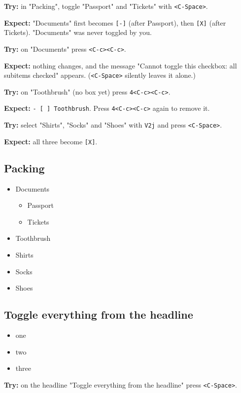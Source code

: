 \textbf{Try:} in "Packing", toggle "Passport" and "Tickets" with \texttt{<C-Space>}.

\textbf{Expect:} "Documents" first becomes \texttt{[-]} (after Passport), then \texttt{[X]}
(after Tickets). "Documents" was never toggled by you.

\textbf{Try:} on "Documents" press \texttt{<C-c><C-c>}.

\textbf{Expect:} nothing changes, and the message "Cannot toggle this checkbox:
all subitems checked" appears. (\texttt{<C-Space>} silently leaves it alone.)

\textbf{Try:} on "Toothbrush" (no box yet) press \texttt{4<C-c><C-c>}.

\textbf{Expect:} \texttt{- [ ] Toothbrush}. Press \texttt{4<C-c><C-c>} again to remove it.

\textbf{Try:} select "Shirts", "Socks" and "Shoes" with \texttt{V2j} and press
\texttt{<C-Space>}.

\textbf{Expect:} all three become \texttt{[X]}.
\subsection{Packing}
\label{sec:orgbdd1cd6}
\begin{itemize}
\item[{$\square$}] Documents
\begin{itemize}
\item[{$\square$}] Passport
\item[{$\square$}] Tickets
\end{itemize}
\item Toothbrush
\item[{$\square$}] Shirts
\item[{$\square$}] Socks
\item[{$\square$}] Shoes
\end{itemize}
\subsection{Toggle everything from the headline}
\label{sec:org3ec8003}
\begin{itemize}
\item[{$\square$}] one
\item[{$\square$}] two
\item[{$\square$}] three
\end{itemize}

\textbf{Try:} on the headline "Toggle everything from the headline" press
\texttt{<C-Space>}.

